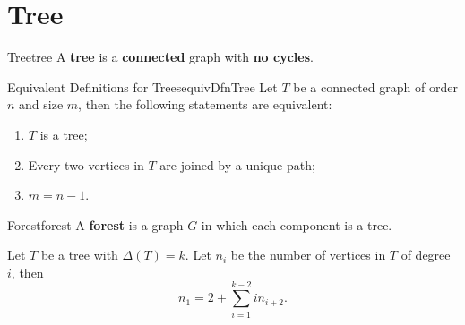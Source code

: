 \documentclass[math]{amznotes}
\theoremstyle{remark}
\begin{document}
\section{Tree}
\begin{dfnbox}{Tree}{tree}
    A {\color{red} \textbf{tree}} is a {\color{red} \textbf{connected}} graph with {\color{red} \textbf{no cycles}}.
\end{dfnbox}
\begin{thmbox}{Equivalent Definitions for Trees}{equivDfnTree}
    Let $T$ be a connected graph of order $n$ and size $m$, then the following statements are equivalent:
    \begin{enumerate}
        \item $T$ is a tree;
        \item Every two vertices in $T$ are joined by a unique path;
        \item $m = n - 1$.
    \end{enumerate}
\end{thmbox}
\begin{dfnbox}{Forest}{forest}
    A {\color{red} \textbf{forest}} is a graph $G$ in which each component is a tree.
\end{dfnbox}
\begin{probox}{}{}
    Let $T$ be a tree with $\Delta(T) = k$. Let $n_i$ be the number of vertices in $T$ of degree $i$, then
    \begin{equation*}
        n_1 = 2 + \sum_{i = 1}^{k - 2}in_{i + 2}.
    \end{equation*}
\end{probox}
\end{document}
